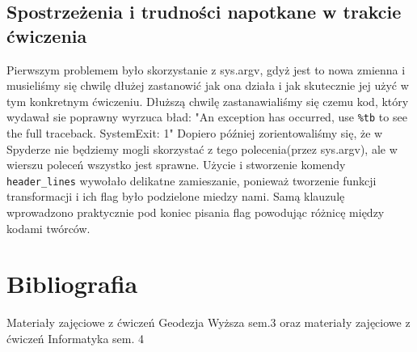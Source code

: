 \documentclass[10pt,a4paper]{article}
\begin{document}
\subsection{Spostrzeżenia i trudności napotkane w trakcie ćwiczenia}
Pierwszym problemem było skorzystanie z sys.argv, gdyż jest to nowa zmienna i musieliśmy się chwilę dłużej zastanowić jak ona działa i jak skutecznie jej użyć w tym konkretnym ćwiczeniu. Dłuższą chwilę zastanawialiśmy się czemu kod, który wydawał sie poprawny wyrzuca bład: "An exception has occurred, use
 \verb|%tb|  to see the full traceback.
\newline
SystemExit: 1"
\newline
Dopiero później zorientowaliśmy się, że w Spyderze nie będziemy mogli skorzystać z tego polecenia(przez sys.argv), ale w wierszu poleceń wszystko jest sprawne. 
\newline
Użycie i stworzenie komendy \verb|header_lines| wywołało delikatne zamieszanie, ponieważ tworzenie funkcji transformacji i ich flag było podzielone miedzy nami. Samą klauzulę wprowadzono praktycznie pod koniec pisania flag powodując różnicę między kodami twórców.

\section{Bibliografia}
Materiały zajęciowe z ćwiczeń Geodezja Wyższa sem.3 oraz materiały zajęciowe z ćwiczeń Informatyka sem. 4
\end{document}
